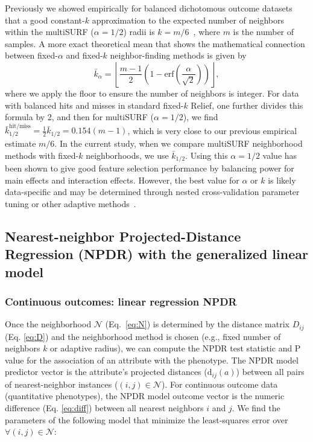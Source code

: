 \documentclass{bioinfo}
\begin{document}
Previously we showed empirically for balanced dichotomous outcome datasets that a good constant-$k$ approximation to the expected number of neighbors within the multiSURF ($\alpha=1/2$) radii is $k=m/6$~\citep{stir}, where $m$ is the number of samples.
A more exact theoretical mean that shows the mathematical connection between fixed-$\alpha$ and fixed-$k$ neighbor-finding methods is given by 
\begin{equation}\label{eq:kbar}
{\bar{k}}_{\alpha} = \left \lfloor \frac{m-1}{2}  \left( 1 - \mathrm{erf}\left( \frac{\alpha}{\sqrt{2}} \right) \right) \right \rfloor,
\end{equation}
where we apply the floor to ensure the number of neighbors is integer.
For data with balanced hits and misses in standard fixed-$k$ Relief, one further divides this formula by 2, and then for multiSURF ($\alpha=1/2$), we find $\bar{k}_{1/2}^{\text{hit/miss}} = \frac{1}{2}\bar{k}_{1/2} = 0.154 (m-1)$, which is very close to our previous empirical estimate $m/6$.
In the current study, when we compare multiSURF neighborhood methods with fixed-$k$ neighborhoods, we use $\bar{k}_{1/2}$.
Using this $\alpha=1/2$ value has been shown to give good feature selection performance by balancing power for main effects and interaction effects.
However, the best value for $\alpha$ or $k$ is likely data-specific and may be determined through nested cross-validation parameter tuning or other adaptive methods~\citep{mckinney13}.

\subsection{Nearest-neighbor Projected-Distance Regression (NPDR) with the generalized linear model}

\subsubsection{Continuous outcomes: linear regression NPDR}\label{sec:regress}

Once the neighborhood $\mathcal{N}$ (Eq.~\ref{eq:N}) is determined by the distance matrix $D_{ij}$ (Eq. \ref{eq:D}) and the neighborhood method is chosen (e.g., fixed number of neighbors $k$ or adaptive radius), we can compute the NPDR test statistic and P value for the association of an attribute with the phenotype.
The NPDR model predictor vector is the attribute's projected distances ($\text{d}_{ij}(a)$) between all pairs of nearest-neighbor instances ($(i,j) \in \mathcal{N}$).
For continuous outcome data (quantitative phenotypes), the NPDR model outcome vector is the numeric difference (Eq. \ref{eq:diff}) between all nearest neighbors $i$ and $j$.
We find the parameters of the following model that minimize the least-squares error over $\forall(i,j) \in \mathcal{N}$: 
\end{document}
